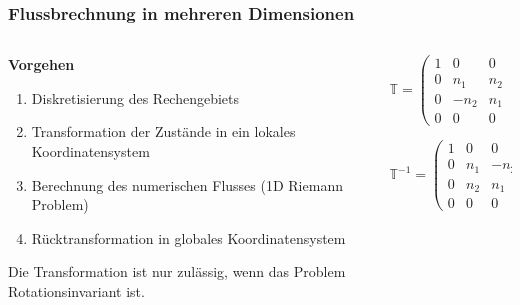 \documentclass[
	11pt, %
	aspectratio=169, %
]{beamer}
\begin{document}
\begin{frame}
	\frametitle{Flussbrechnung in mehreren Dimensionen}
	\begin{columns}[c] %
		\begin{column}{0.55\textwidth} %
			\textbf{Vorgehen}
			\vspace*{0.3cm}
			\begin{enumerate}
				\item Diskretisierung des Rechengebiets
				\item Transformation der Zustände in ein lokales Koordinatensystem
				\item Berechnung des numerischen Flusses (1D Riemann Problem)
				\item Rücktransformation in globales Koordinatensystem
			\end{enumerate}
			\vspace*{1cm}
			Die Transformation ist nur zulässig, wenn das Problem Rotationsinvariant ist.
		\end{column}
		\begin{column}{0.4\textwidth} %
			\begin{equation}
				\mathbb{T} = \begin{pmatrix}
					1 & 0 & 0 & 0\\
					0 & n_1 & n_2 & 0 \\
					0 & -n_2 & n_1 & 0 \\
					0 & 0   & 0 & 1
					\end{pmatrix}
			\end{equation}

			\begin{equation}
				\mathbb{T}^{-1} = \begin{pmatrix}
					1 & 0 & 0 & 0\\
					0 & n_1 & -n_2 & 0 \\
					0 & n_2 & n_1 & 0 \\
					0 & 0   & 0 & 1
					\end{pmatrix}
			\end{equation}
		\end{column}
	\end{columns}


\end{frame}	


\end{document}
